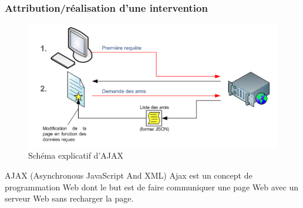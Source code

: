 \begin{frame}
\frametitle{Attribution/réalisation d'une intervention}
      \begin{figure}[r]
		\includegraphics[scale=0.27]{images/ajax.png}
		\caption{Schéma explicatif d'AJAX}
	  \end{figure}
      \begin{block}{AJAX (Asynchronous JavaScript And XML)}
		Ajax est un concept de programmation Web dont le but est de faire communiquer une page Web avec un serveur Web sans recharger la page.
	  \end{block}
\end{frame}
